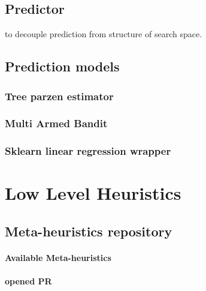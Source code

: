 \subsection{Predictor}
to decouple prediction from structure of search space.

\subsection{Prediction models}
\subsubsection{Tree parzen estimator}
\subsubsection{Multi Armed Bandit}
\subsubsection{Sklearn linear regression wrapper}


\section{Low Level Heuristics}
\subsection{Meta-heuristics repository}
\paragraph{Available Meta-heuristics}
\paragraph{opened PR}

